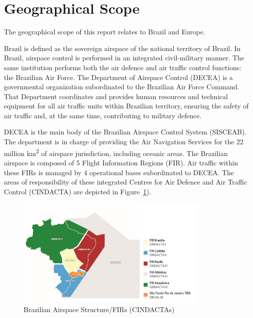 \documentclass[
  a4paper,
  DIV=11,
  numbers=noendperiod]{scrreprt}
\begin{document}
\hypertarget{geographical-scope}{%
\section{Geographical Scope}\label{geographical-scope}}

The geographical scope of this report relates to Brazil and Europe.

Brazil is defined as the sovereign airspace of the national territory of
Brazil. In Brazil, airspace control is performed in an integrated
civil-military manner. The same institution performs both the air
defence and air traffic control functions: the Brazilian Air Force. The
Department of Airspace Control (DECEA) is a governmental organization
subordinated to the Brazilian Air Force Command. That Department
coordinates and provides human resources and technical equipment for all
air traffic units within Brazilian territory, ensuring the safety of air
traffic and, at the same time, contributing to military defence.

DECEA is the main body of the Brazilian Airspace Control System
(SISCEAB). The department is in charge of providing the Air Navigation
Services for the 22 million km\textsuperscript{2} of airspace
jurisdiction, including oceanic areas. The Brazilian airspace is
composed of 5 Flight Information Regions (FIR). Air traffic within these
FIRs is managed by 4 operational bases subordinated to DECEA. The areas
of responsibility of these integrated Centres for Air Defence and Air
Traffic Control (CINDACTA) are depicted in
Figure~\ref{fig-BRA-airspace}).

\begin{figure}[h]

{\centering \includegraphics[width=3.71in,height=\textheight]{././figures/BRAZIL_CINDACTA_AND_CRCEA.png}

}

\caption{\label{fig-BRA-airspace}Brazilian Airspace Structure/FIRs
(CINDACTAs)}

\end{figure}
\end{document}

